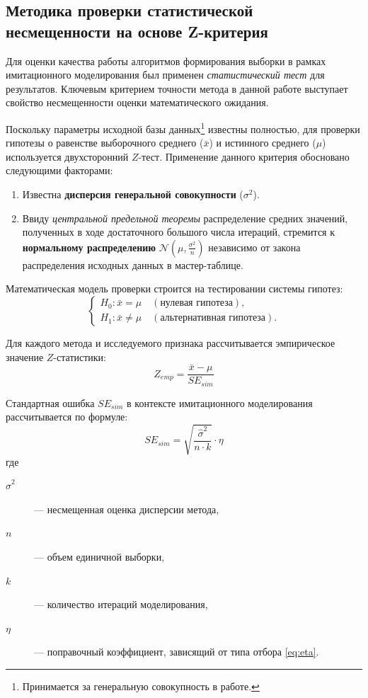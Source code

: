 \hypertarget{z-test}{\subsection{Методика проверки статистической несмещенности на основе Z-критерия}}

Для оценки качества работы алгоритмов формирования выборки в рамках имитационного моделирования
был применен \textit{статистический тест} для результатов.
Ключевым критерием точности метода в данной работе выступает свойство несмещенности оценки 
математического ожидания.

Поскольку параметры исходной базы данных\footnote{Принимается за генеральную совокупность в работе.}
известны полностью, для проверки гипотезы о равенстве выборочного 
среднего ($\bar{x}$) и истинного среднего ($\mu$) используется двухсторонний $Z$-тест. Применение 
данного критерия обосновано следующими факторами:

\begin{enumerate}[noitemsep]
    \item Известна \textbf{дисперсия генеральной совокупности} ($\sigma^2$).
    \item Ввиду \textit{центральной предельной теоремы} распределение средних значений, полученных в ходе достаточного большого числа итераций, стремится к \textbf{нормальному распределению} $\mathcal{N}(\mu, \frac{\sigma^2}{n})$ независимо от закона распределения исходных данных в мастер-таблице.
\end{enumerate}

Математическая модель проверки строится на тестировании системы гипотез:
\begin{equation}
\begin{cases}
H_0: \bar{x} = \mu \quad (\text{нулевая гипотеза}), \\
H_1: \bar{x} \neq \mu \quad (\text{альтернативная гипотеза}).
\end{cases}
\end{equation}

Для каждого метода и исследуемого признака рассчитывается эмпирическое значение $Z$-статистики:
\begin{equation}
    Z_{emp} = \frac{\bar{x} - \mu}{SE_{sim}}
\end{equation}

Стандартная ошибка $SE_{sim}$ в контексте имитационного моделирования рассчитывается по формуле:
\begin{equation}
    SE_{sim} = \sqrt {\frac{\hat{\sigma}^2}{n \cdot k}} \cdot \eta
\end{equation}
где 
\begin{description}
    \item[$\hat{\sigma}^2$] --- несмещенная оценка дисперсии метода, 
    \item[$n$] --- объем единичной выборки, 
    \item[$k$] --- количество итераций моделирования, 
    \item[$\eta$] --- поправочный коэффициент, зависящий от типа отбора \eqref{eq:eta}.
\end{description}

